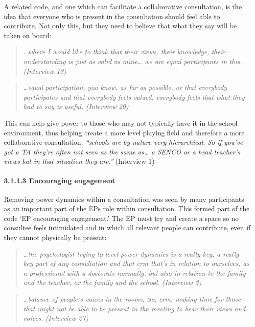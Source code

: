 \documentclass[
  english,
  man]{apa7}
\let\oldparagraph\paragraph
\renewcommand{\paragraph}[1]{\oldparagraph{#1}\mbox{}}
\begin{document}
A related code, and one which can facilitate a collaborative consultation, is the idea that everyone who is present in the consultation should feel able to contribute. Not only this, but they need to believe that what they say will be taken on board:

\begin{quote}
\emph{\ldots where I would like to think that their views, their knowledge, their
understanding is just as valid as mine\ldots{} we are equal participants in
this. (Interview 13)}
\end{quote}

\begin{quote}
\emph{\ldots equal participation, you know, as far as possible, or that everybody
participates and that everybody feels valued, everybody feels that
what they had to say is useful. (Interview 20)}
\end{quote}

This can help give power to those who may not typically have it in the school environment, thus helping create a more level playing field and therefore a more collaborative consultation: \emph{``schools are by nature very hierarchical. So if you've got a TA they're often not seen as the same as\ldots{} a SENCO or a head teacher's views but in that situation they are.''} (Interview 1)

\hypertarget{encouraging-engagement}{%
\paragraph{3.1.1.3 Encouraging engagement}\label{encouraging-engagement}}

Removing power dynamics within a consultation was seen by many participants as an important part of the EPs role within consultation. This formed part of the code `EP encouraging engagement.' The EP must try and create a space so no consultee feels intimidated and in which all relevant people can contribute, even if they cannot physically be present:

\begin{quote}
\emph{\ldots the psychologist trying to level power dynamics is a really key, a
really key part of any consultation and that erm that's in relation to
ourselves, as a professional with a doctorate normally, but also in
relation to the family and the teacher, or the family and the school.
(Interview 2)}
\end{quote}

\begin{quote}
\emph{\ldots balance of people's voices in the rooms. So, erm, making time for
those that might not be able to be present in the meeting to hear
their views and voices. (Interview 27)}
\end{quote}
\end{document}

